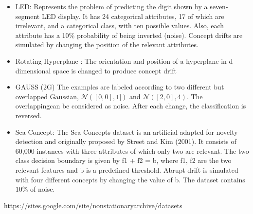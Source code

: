 \documentclass[11pt,a4paper]{report}
\begin{document}
\begin{itemize}
\item LED: Represents the problem of predicting the digit shown by a seven-segment LED display. It has 24 categorical attributes, 17 of which are irrelevant, and a categorical class, with ten possible values. Also, each attribute has a 10\% probability of being inverted (noise). Concept drifts are simulated by changing the position of the relevant attributes. 


\item Rotating Hyperplane : The orientation and position of a hyperplane in d-dimensional space is changed to produce concept drift

\item GAUSS (2G) The examples are labeled according to two different but overlapped Gaussian, $\mathcal{N}([0,0],1])$ and $\mathcal{N}([2,0],4)$. The overlappingcan be considered as noise. After each change, the classification is reversed.

\item Sea Concept: The Sea Concepts dataset is an artificial adapted for novelty detection and originally proposed by Street and Kim (2001). It consists of 60,000 instances with three attributes of which only two are relevant. The two class decision boundary is given by f1 + f2 = b, where f1, f2 are the two relevant features and b is a predefined threshold. Abrupt drift is simulated with four different concepts by changing the value of b. The dataset contains 10\% of noise. 

\end{itemize}



\newpage



https://sites.google.com/site/nonstationaryarchive/datasets
\end{document}
